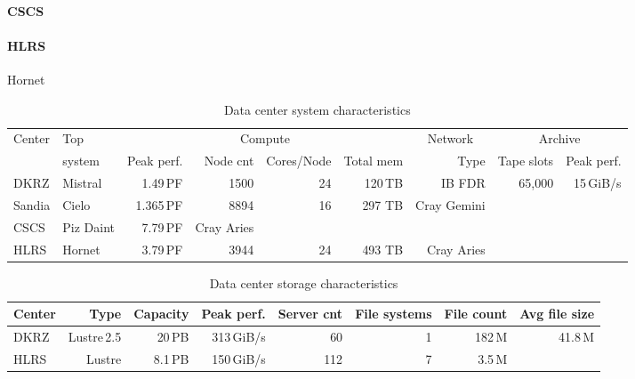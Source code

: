 \documentclass{superfri}
\numberwithin{equation}{section}
\begin{document}
\paragraph{CSCS}

\paragraph{HLRS}
Hornet


\begin{table}[bt]
\renewcommand{\arraystretch}{0.9}
\renewcommand{\tabcolsep}{0.1cm}
\begin{tabular}[c]{ll|r|r|r|r||r||r|r}
Center & Top    & \multicolumn{4}{c||}{Compute}      & \multicolumn{1}{c||}{Network}               & \multicolumn{2}{c}{Archive} \\
 & system & Peak perf. & Node cnt & Cores/Node & Total mem & Type                 & Tape slots & Peak perf. \\ \hline
 \hline

DKRZ & Mistral & 1.49\,PF   & 1500       & 24         & 120\,TB  & IB FDR     & 65,000 & 15\,GiB/s \\ \hline
Sandia & Cielo & 1.365\,PF & 8894 & 16 & 297 TB & Cray Gemini & \\ \hline
CSCS & Piz Daint & 7.79\,PF & Cray Aries \\ \hline
HLRS & Hornet & 3.79\,PF & 3944 & 24 & 493 TB & Cray Aries &   \\ \hline

\end{tabular}
\caption{Data center system characteristics\label{tbl:overviewCharacteristics}}
\end{table}

\begin{table}[bt]
\renewcommand{\arraystretch}{0.9}
\renewcommand{\tabcolsep}{0.1cm}
\begin{tabular}[c]{l|r|r|r|r|r|r|r}
Center & Type        & Capacity  & Peak perf.     & Server cnt & File systems & File count    & Avg file size    \\ \hline
DKRZ   & Lustre\,2.5 & 20\,PB    & 313\,GiB/s     & 60         & 1            & 182\,M        & 41.8\,M           \\ \hline
HLRS   & Lustre  & 8.1\,PB       & 150\,GiB/s     & 112        & 7            & 3.5\,M        & 

\end{tabular}
\caption{Data center storage characteristics\label{tbl:overviewIO}}
\end{table}
\end{document}
